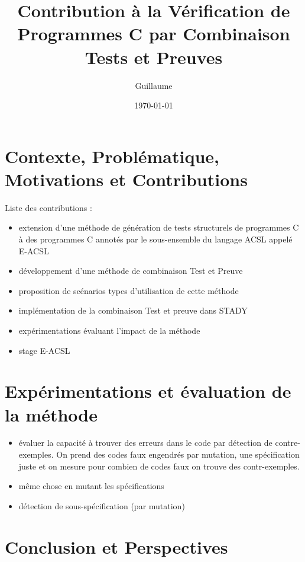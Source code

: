 \documentclass[a4paper,11pt]{report}
\begin{document}
 
\title{Contribution à la Vérification de Programmes C
  par Combinaison Tests et Preuves}
\author{Guillaume }
\date{\today}
 
\maketitle


\tableofcontents
\listoffigures


\chapter{Contexte, Problématique, Motivations et Contributions}

Liste des contributions :
\begin{itemize}
\item extension d'une méthode de génération de tests structurels de programmes C
  à des programmes C annotés par le sous-ensemble du langage ACSL appelé E-ACSL
\item développement d'une méthode de combinaison Test et Preuve
\item proposition de scénarios types d'utilisation de cette méthode
\item implémentation de la combinaison Test et preuve dans STADY
\item expérimentations évaluant l'impact de la méthode
\item stage E-ACSL
\end{itemize}





\chapter{Expérimentations et évaluation de la méthode}

\begin{itemize}
\item évaluer la capacité à trouver des erreurs dans le code par détection de
  contre-exemples. On prend des codes faux engendrés par mutation, une
  spécification juste et on mesure pour combien de codes faux on trouve des
  contr-exemples.
\item même chose en mutant les spécifications
\item détection de sous-spécification (par mutation)
\end{itemize}

\chapter{Conclusion et Perspectives}



\begin{scriptsize}


\end{scriptsize}
\end{document}
